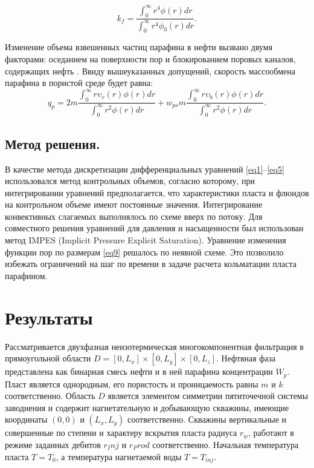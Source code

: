 \documentclass[12pt,twoside,a4paper]{uz_ku}
\begin{document}
\begin{equation}\label{eq11}
k_f = \frac
{ \int_{0}^{\infty} r^4 \phi (r) dr}
{ \int_{0}^{\infty} r^4 \phi_0 (r) dr}.
\end{equation}

	Изменение объема взвешенных частиц парафина в нефти вызвано двумя факторами: оседанием на поверхности пор и блокированием поровых каналов, содержащих нефть \cite{4}. Ввиду вышеуказанных допущений, скорость массообмена парафина в пористой среде будет равна:
\begin{equation}\label{eq12}
q_p =
2 m \frac{ \int_{0}^{\infty} r \upsilon_r(r) \phi (r) dr}{ \int_{0}^{\infty} r^2 \phi(r) dr} + 
w_{ps} m  \frac{ \int_{0}^{\infty} r \upsilon_b(r) \phi (r) dr}{ \int_{0}^{\infty} r^2 \phi(r) dr}.
\end{equation}


\subsection{Метод решения. }
	В качестве метода дискретизации дифференциальных уравнений \eqref{eq1}--\eqref{eq5} использовался метод контрольных объемов, согласно которому, при интегрировании уравнений предполагается, что характеристики пласта и флюидов на контрольном объеме имеют постоянные значения. Интегрирование конвективных слагаемых выполнялось по схеме вверх по потоку. Для совместного решения уравнений для давления и насыщенности был использован метод IMPES (Implicit Pressure Explicit Saturation). Уравнение изменения функции пор по размерам \eqref{eq9} решалось по неявной схеме. Это позволило избежать ограничений на шаг по времени в задаче расчета кольматации пласта парафином.


\section{Результаты}
	Рассматривается двухфазная неизотермическая многокомпонентная фильтрация в прямоугольной области $D = [0, L_x] \times [0, L_y] \times [0, L_z]$. Нефтяная фаза представлена как бинарная смесь нефти и в ней парафина концентрации $W_p$. Пласт является однородным, его пористость и проницаемость равны $m$ и $k$ соответственно. Область $D$ является элементом симметрии пятиточечной системы заводнения и содержит нагнетательную и добывающую скважины, имеющие координаты $(0, 0)$ и $(L_x, L_y)$ соответственно. Скважины вертикальные и совершенные по степени и характеру вскрытия пласта радиуса $r_w$, работают в режиме заданных дебитов $r_Inj$ и $r_Prod$ соответственно. Начальная температура пласта $T=T_0$, а температура нагнетаемой воды $T=T_{inj}$.
\end{document}
